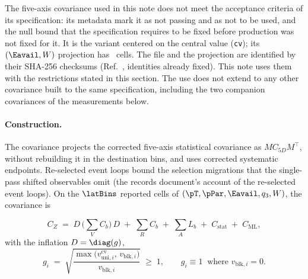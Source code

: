 The five-axis covariance used in this note does not meet the acceptance criteria of its specification: its metadata mark it as not passing and as not to be used, and the null bound that the specification requires to be fixed before production was not fixed for it. It is the variant centered on the central value (\texttt{cv}); its $(\Eavail,W)$ projection has \zprojCells\ cells. The file and the projection are identified by their SHA-256 checksums (Ref.~\cite{NoteRecords2026}, identities already fixed). This note uses them with the restrictions stated in this section. The use does not extend to any other covariance built to the same specification, including the two companion covariances of the measurements below.

\paragraph{Construction.} The covariance projects the corrected five-axis statistical covariance as $M C_{5D}M^{\top}$, without rebuilding it in the destination bins, and uses corrected systematic endpoints. Re-selected event loops bound the selection migrations that the single-pass shifted observables omit (the records document's account of the re-selected event loops). On the $\latBins$ reported cells of $(\pT,\pPar,\Eavail,q_{3},W)$, the covariance is

\begin{equation}
  \label{eq:zassembly}
  C_{Z} \;=\; D\,\Big(\textstyle\sum_{V} C_{b}\Big)\,D
  \;+\; \textstyle\sum_{R} C_{b}
  \;+\; \textstyle\sum_{A} L_{b}
  \;+\; C_{\mathrm{stat}}
  \;+\; C_{\mathrm{ML}},
\end{equation}
with the inflation $D=\diag(g)$,
\begin{equation}
  \label{eq:zinflation}
  g_{i} \;=\;
  \sqrt{\frac{\max\!\big(v^{\mathrm{cv}}_{\mathrm{uni},i},\,
                         v_{\mathrm{blk},i}\big)}
             {v_{\mathrm{blk},i}}}
  \;\ge\; 1,
  \qquad
  g_{i}\equiv 1 \ \text{ where } v_{\mathrm{blk},i}=0 .
\end{equation}

